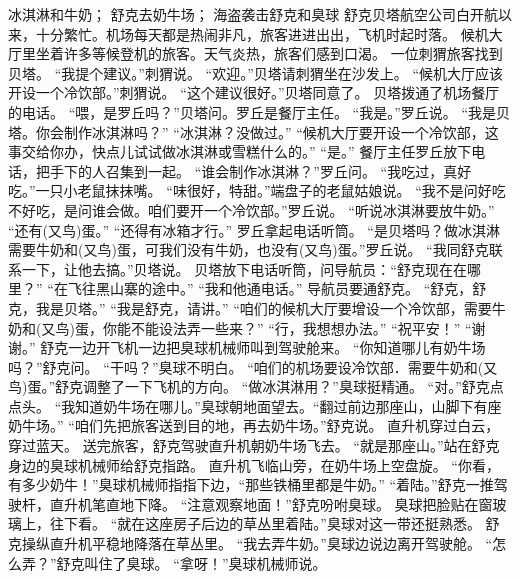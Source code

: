 \documentclass[a4paper,12pt,UTF8,twoside]{ctexbook}
\begin{document}
        冰淇淋和牛奶； 
        舒克去奶牛场； 
        海盗袭击舒克和臭球   
        舒克贝塔航空公司白开航以来，十分繁忙。机场每天都是热闹非凡，旅客进进出出，飞机时起时落。 
        候机大厅里坐着许多等候登机的旅客。天气炎热，旅客们感到口渴。 
        一位刺猬旅客找到贝塔。 
        “我提个建议。”刺猬说。 
        “欢迎。”贝塔请刺猬坐在沙发上。 
        “候机大厅应该开设一个冷饮部。”刺猬说。 
        “这个建议很好。”贝塔同意了。 
        贝塔拨通了机场餐厅的电话。 
        “喂，是罗丘吗？”贝塔问。罗丘是餐厅主任。 
        “我是。”罗丘说。 
        “我是贝塔。你会制作冰淇淋吗？” 
        “冰淇淋？没做过。” 
        “候机大厅要开设一个冷饮部，这事交给你办，快点儿试试做冰淇淋或雪糕什么的。” 
        “是。” 
        餐厅主任罗丘放下电话，把手下的人召集到一起。 
        “谁会制作冰淇淋？”罗丘问。 
        “我吃过，真好吃。”一只小老鼠抹抹嘴。 
        “味很好，特甜。”端盘子的老鼠姑娘说。 
        “我不是问好吃不好吃，是问谁会做。咱们要开一个冷饮部。”罗丘说。 
        “听说冰淇淋要放牛奶。” 
        “还有(又鸟)蛋。” 
        “还得有冰箱才行。” 
        罗丘拿起电话听筒。 
        “是贝塔吗？做冰淇淋需要牛奶和(又鸟)蛋，可我们没有牛奶，也没有(又鸟)蛋。”罗丘说。 
        “我同舒克联系一下，让他去搞。”贝塔说。 
        贝塔放下电话听筒，问导航员：“舒克现在在哪里？” 
        “在飞往黑山寨的途中。” 
        “我和他通电话。” 
        导航员要通舒克。 
        “舒克，舒克，我是贝塔。” 
        “我是舒克，请讲。” 
        “咱们的候机大厅要增设一个冷饮部，需要牛奶和(又鸟)蛋，你能不能设法弄一些来？” 
        “行，我想想办法。” 
        “祝平安！” 
        “谢谢。” 
        舒克一边开飞机一边把臭球机械师叫到驾驶舱来。 
        “你知道哪儿有奶牛场吗？”舒克问。 
        “干吗？”臭球不明白。 
        “咱们的机场要设冷饮部．需要牛奶和(又鸟)蛋。”舒克调整了一下飞机的方向。 
        “做冰淇淋用？”臭球挺精通。 
        “对。”舒克点点头。 
        “我知道奶牛场在哪儿。”臭球朝地面望去。“翻过前边那座山，山脚下有座奶牛场。” 
        “咱们先把旅客送到目的地，再去奶牛场。”舒克说。 
        直升机穿过白云，穿过蓝天。 
        送完旅客，舒克驾驶直升机朝奶牛场飞去。 
        “就是那座山。”站在舒克身边的臭球机械师给舒克指路。 
        直升机飞临山旁，在奶牛场上空盘旋。 
        “你看，有多少奶牛！”臭球机械师指指下边，“那些铁桶里都是牛奶。” 
        “着陆。”舒克一推驾驶杆，直升机笔直地下降。 
        “注意观察地面！”舒克吩咐臭球。 
        臭球把脸贴在窗玻璃上，往下看。 
        “就在这座房子后边的草丛里着陆。”臭球对这一带还挺熟悉。 
        舒克操纵直升机平稳地降落在草丛里。 
        “我去弄牛奶。”臭球边说边离开驾驶舱。 
        “怎么弄？”舒克叫住了臭球。 
        “拿呀！”臭球机械师说。 
\end{document}
